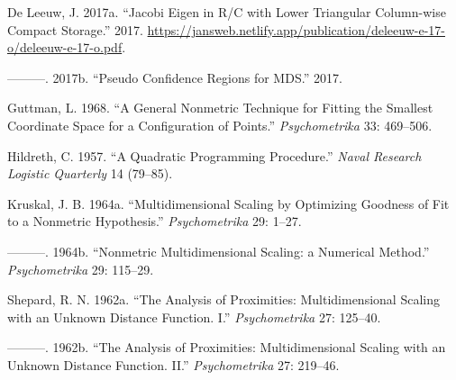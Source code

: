 \documentclass[
  12pt,
]{article}
\newlength{\cslhangindent}
\newenvironment{CSLReferences}[2] %
 {\begin{list}{}{%
  \setlength{\itemindent}{0pt}
  \setlength{\leftmargin}{0pt}
  \setlength{\parsep}{0pt}
  \ifodd #1
   \setlength{\leftmargin}{\cslhangindent}
   \setlength{\itemindent}{-1\cslhangindent}
  \fi
  \setlength{\itemsep}{#2\baselineskip}}}
 {\end{list}}
\begin{document}
\label{refs}
\begin{CSLReferences}{1}{0}
De Leeuw, J. 2017a. {``{Jacobi Eigen in R/C with Lower Triangular Column-wise Compact Storage}.''} 2017. \url{https://jansweb.netlify.app/publication/deleeuw-e-17-o/deleeuw-e-17-o.pdf}.

---------. 2017b. {``{Pseudo Confidence Regions for MDS}.''} 2017.

Guttman, L. 1968. {``{A General Nonmetric Technique for Fitting the Smallest Coordinate Space for a Configuration of Points}.''} \emph{Psychometrika} 33: 469--506.

Hildreth, C. 1957. {``{A Quadratic Programming Procedure}.''} \emph{Naval Research Logistic Quarterly} 14 (79--85).

Kruskal, J. B. 1964a. {``{Multidimensional Scaling by Optimizing Goodness of Fit to a Nonmetric Hypothesis}.''} \emph{Psychometrika} 29: 1--27.

---------. 1964b. {``{Nonmetric Multidimensional Scaling: a Numerical Method}.''} \emph{Psychometrika} 29: 115--29.

Shepard, R. N. 1962a. {``{The Analysis of Proximities: Multidimensional Scaling with an Unknown Distance Function. I}.''} \emph{Psychometrika} 27: 125--40.

---------. 1962b. {``{The Analysis of Proximities: Multidimensional Scaling with an Unknown Distance Function. II}.''} \emph{Psychometrika} 27: 219--46.

\end{CSLReferences}
\end{document}
